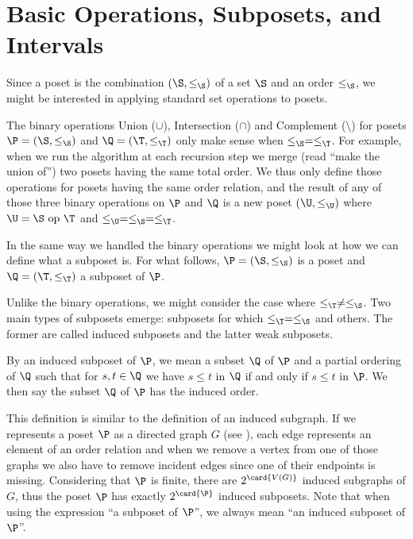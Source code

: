 \section{Basic Operations, Subposets, and Intervals}
\label{tree:poset:sub}


Since a poset is the combination $(\S, \le_{\S})$ of a set $\S$ and an order
$\le_{\S}$, we might be interested in applying standard set operations to posets.

The binary operations Union ($\cup$), Intersection ($\cap$) and Complement
($\setminus$) for posets $\P = (\S, \le_{\S})$ and $\Q = (\T, \le_{\T})$ only make sense
when $\le_{\S} = \le_{\T}$. For example, when we run the algorithm \mergesort at each
recursion step we merge (read ``make the union of'') two posets having the same
total order. We thus only define those operations for posets having the same
order relation, and the result of any of those three binary operations on $\P$
and $\Q$ is a new poset $(\U, \le_{\U})$ where $\U = \S~\text{op}~\T$ and $\le_{\U} =
\le_{\S} = \le_{\T}$.


In the same way we handled the binary operations we might look at how we can
define what a subposet is. For what follows, $\P = (\S, \le_{\S})$ is a poset
and $\Q = (\T, \le_{\T})$ a subposet of $\P$.

Unlike the binary operations, we might consider the case where $\le_{\T} \neq
\le_{\S}$. Two main types of subposets emerge: subposets for which $\le_{\T} =
\le_{\S}$ and others. The former are called induced subposets and the latter
weak subposets.
\begin{definition}
By an induced subposet of $\P$, we mean a subset $\Q$ of $\P$ and a partial
ordering of $\Q$ such that for $s, t \in \Q$ we have $s \leq t$ in $\Q$ if and
only if $s \leq t$ in $\P$. We then say the subset $\Q$ of $\P$ has the induced
order.
\end{definition}

This definition is similar to the definition of an induced subgraph. If we
represents a poset $\P$ as a directed graph $G$ (see
), each edge represents an element of an order relation
and when we remove a vertex from one of those graphs we also have to remove
incident edges since one of their endpoints is missing. Considering that $\P$ is
finite, there are $2^{\card{V(G)}}$ induced subgraphs of $G$, thus the poset $\P$ has
exactly $2^{\card{\P}}$ induced subposets. Note that when using the expression
``a subposet of $\P$'', we always mean ``an induced subposet of $\P$''.

